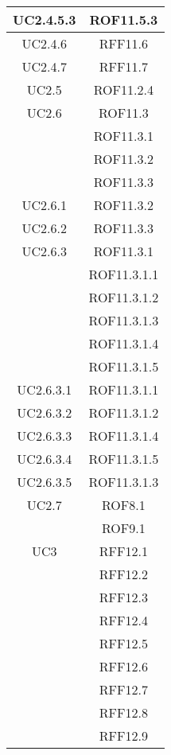 \begin{longtable}{|c|c|}
\midrule
UC2.4.5.3
& ROF11.5.3\\

\midrule
UC2.4.6
& RFF11.6\\

\midrule
UC2.4.7
& RFF11.7\\

\midrule
UC2.5
& ROF11.2.4\\

\midrule
UC2.6
& ROF11.3\\
& ROF11.3.1\\
& ROF11.3.2\\
& ROF11.3.3\\

\midrule
UC2.6.1
& ROF11.3.2\\

\midrule
UC2.6.2
& ROF11.3.3\\

\midrule
UC2.6.3
& ROF11.3.1\\
& ROF11.3.1.1\\
& ROF11.3.1.2\\
& ROF11.3.1.3\\
& ROF11.3.1.4\\
& ROF11.3.1.5\\

\midrule
UC2.6.3.1
& ROF11.3.1.1\\

\midrule
UC2.6.3.2
& ROF11.3.1.2\\

\midrule
UC2.6.3.3
& ROF11.3.1.4\\

\midrule
UC2.6.3.4
& ROF11.3.1.5\\

\midrule
UC2.6.3.5
& ROF11.3.1.3\\

\midrule
UC2.7
& ROF8.1\\
& ROF9.1\\


\midrule
UC3
& RFF12.1\\
& RFF12.2\\
& RFF12.3\\
& RFF12.4\\
& RFF12.5\\
& RFF12.6\\
& RFF12.7\\
& RFF12.8\\
& RFF12.9\\


\end{longtable}

